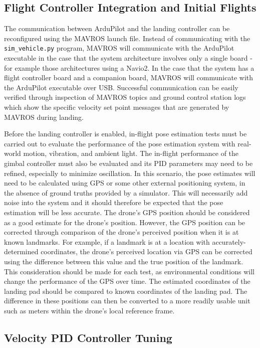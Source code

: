 \subsection{Flight Controller Integration and Initial Flights}

The communication between ArduPilot and the landing controller can be reconfigured using the MAVROS launch file. Instead of communicating with the \texttt{sim\_vehicle.py} program, MAVROS will communicate with the ArduPilot executable in the case that the system architecture involves only a single board - for example those architectures using a Navio2. In the case that the system has a flight controller board and a companion board, MAVROS will communicate with the ArduPilot executable over USB. Successful communication can be easily verified through inspection of MAVROS topics and ground control station logs which show the specific velocity set point messages that are generated by MAVROS during landing.

Before the landing controller is enabled, in-flight pose estimation tests must be carried out to evaluate the performance of the pose estimation system with real-world motion, vibration, and ambient light. The in-flight performance of the gimbal controller must also be evaluated and its PID parameters may need to be refined, especially to minimize oscillation. In this scenario, the pose estimates will need to be calculated using GPS or some other external positioning system, in the absence of ground truths provided by a simulator. This will necessarily add noise into the system and it should therefore be expected that the pose estimation will be less accurate. The drone's GPS position should be considered as a good estimate for the drone's position. However, the GPS position can be corrected through comparison of the drone's perceived position when it is at known landmarks. For example, if a landmark is at a location with accurately-determined coordinates, the drone's perceived location via GPS can be corrected using the difference between this value and the true position of the landmark. This consideration should be made for each test, as environmental conditions will change the performance of the GPS over time. The estimated coordinates of the landing pad should be compared to known coordinates of the landing pad. The difference in these positions can then be converted to a more readily usable unit such as meters within the drone's local reference frame.

\subsection{Velocity PID Controller Tuning}

